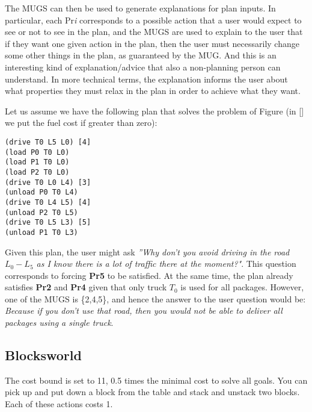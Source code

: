 The MUGS can then be used to generate explanations for plan inputs. In particular, each Pr\textit{i} corresponds to a possible action that a user would expect to see or not to see in the plan, and the MUGS are used to explain to the user that if they want one given action in the plan, then the user must necessarily change some other things in the plan, as guaranteed by the MUG. And this is an interesting kind of explanation/advice that also a non-planning person can understand. In more technical terms, the explanation informs the user about what properties they must relax in the plan in order to achieve what they want.

Let us assume we have the following plan that solves the problem of Figure  (in [] we put the fuel cost if greater than zero):

\begin{verbatim}
(drive T0 L5 L0) [4]
(load P0 T0 L0) 
(load P1 T0 L0) 
(load P2 T0 L0) 
(drive T0 L0 L4) [3]
(unload P0 T0 L4) 
(drive T0 L4 L5) [4]
(unload P2 T0 L5)
(drive T0 L5 L3) [5]
(unload P1 T0 L3)
\end{verbatim}

Given this plan, the user might ask \textit{''Why don't you avoid driving in the road $L_0-L_5$ as I know there is a lot of traffic there at the moment?"}. This question corresponds to forcing \textbf{Pr5} to be satisfied. At the same time, the plan already satisfies \textbf{Pr2} and \textbf{Pr4} given that only truck $T_0$ is used for all packages. However, one of the MUGS is \{2,4,5\}, and hence the answer to the user question would be: \textit{Because if you don't use that road, then you would not be able to deliver all packages using a single truck}.




\subsection{Blocksworld}

The cost bound is set to 11, 0.5 times the minimal cost to solve all goals.
You can pick up and put down a block from the table and stack and unstack two blocks.
Each of these actions costs 1.

